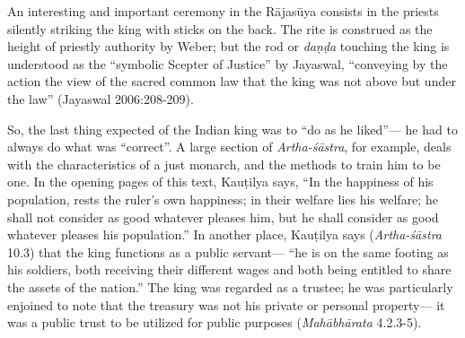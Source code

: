 An interesting and important ceremony in the Rājasūya consists in the priests silently striking the king with sticks on the back. The rite is construed as the height of priestly authority by Weber; but the rod or {\sl daṇḍa} touching the king is understood as the “symbolic Scepter of Justice” by Jayaswal, “conveying by the action the view of the sacred common law that the king was not above but under the law” (Jayaswal 2006:208-209). 

So, the last thing expected of the Indian king was to “do as he liked”--- he had to always do what was “correct”. A large section of {\sl Artha-śāstra}, for example, deals with the characteristics of a just monarch, and the methods to train him to be one. In the opening pages of this text, Kauṭilya says, “In the happiness of his population, rests the ruler’s own happiness; in their welfare lies his welfare; he shall not consider as good whatever pleases him, but he shall consider as good whatever pleases his population.” In another place, Kauṭilya says ({\sl Artha-śāstra} 10.3) that the king functions as a public servant--- “he is on the same footing as his soldiers, both receiving their different wages and both being entitled to share the assets of the nation.” The king was regarded as a trustee; he was particularly enjoined to note that the treasury was not his private or personal property--- it was a public trust to be utilized for public purposes ({\sl Mahābhārata} 4.2.3-5).

